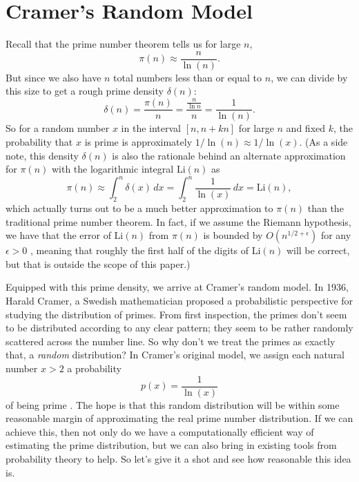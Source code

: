 \documentclass[conference]{IEEEtran}
\begin{document}
\section{Cramer's Random Model}
Recall that the prime number theorem tells us for
large $n$,
\[\pi(n) \approx \frac{n}{\ln(n)}.\]
But since we also have $n$ total numbers less than or equal to
$n$, we can divide by this size to get a rough prime density
$\delta(n)$:
\[\delta(n) = \frac{\pi(n)}{n} = \frac{\frac{n}{\ln{n}}}{n} = \frac{1}{\ln(n)}.\]
So for a random number $x$ in the interval $[n, n + kn]$ for
large $n$ and fixed $k$, the probability that $x$ is prime is
approximately $1 / \ln(n) \approx 1 / \ln(x)$. (As a side note, this
density $\delta(n)$ is also the rationale behind an alternate
approximation for $\pi(n)$ with the logarithmic integral
$\mathrm{Li}(n)$ as
\[\pi(n) \approx \int_2^{n} \delta(x)\, dx = \int_2^{n} \frac{1}{\ln(x)}\, dx = \mathrm{Li}(n),\]
which actually turns out to be a much better approximation to
$\pi(n)$ than the traditional prime number theorem. In
fact, if we assume the
Riemann hypothesis, we have that the error of $\mathrm{Li}(n)$ from
$\pi(n)$ is bounded by $O(n^{1/2 + \epsilon})$ for any
$\epsilon > 0$ \cite{b7}, meaning that roughly the first half of the
digits of
$\mathrm{Li}(n)$ will be correct,
but that is outside the scope of this paper.)

Equipped with this prime density, we arrive at
Cramer's random model. In 1936, Harald Cramer, a Swedish mathematician
proposed a probabilistic perspective for studying
the distribution of primes. From first inspection,
the primes don't seem to be distributed according to
any clear pattern; they seem to be rather randomly
scattered across the number line. So why don't
we treat the primes as exactly that, a \textit{random} distribution?
In Cramer's original model, we assign each natural number
$x > 2$ a probability
\[p(x) = \frac{1}{\ln(x)}\]
of being prime \cite{b4}.
The hope is that this random distribution will be within
some reasonable margin of approximating the real prime
number distribution. If we can achieve this, then not only
do we have a computationally efficient way of
estimating the prime distribution, but we can also bring
in existing tools from probability theory to help. So
let's give it a shot and see how reasonable this idea is.
\end{document}
